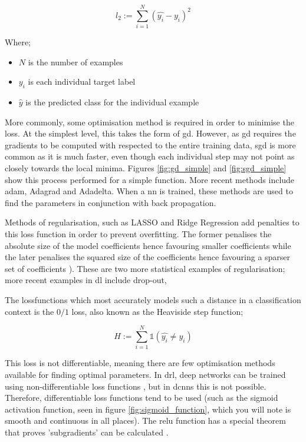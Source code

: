 \begin{equation}
l_2 := \sum_{i = 1}^N (\hat{y_i} - y_i)^2
\end{equation}

Where;

\begin{itemize}
\item $N$ is the number of examples  
\item $y_i$ is each individual target label  
\item $\hat{y}$ is the predicted class for the individual example 
\end{itemize}

More commonly, some optimisation method is required in order to minimise the \gls{loss}.  At the simplest level, this takes the form of \gls{gd}. However, as \gls{gd} requires the gradients to be computed with respected to the entire training data, \gls{sgd} is more common as it is much faster, even though each individual step may not point as closely towards the local minima. Figures  \ref{fig:gd_simple} and \ref{fig:sgd_simple} show this process performed for a simple function. More recent methods include  \gls{adam}, Adagrad and Adadelta. When a \gls{nn} is trained, these methods are used to find the parameters in conjunction with back propagation.  %

Methods of regularisation, such as LASSO and Ridge Regression add penalties to this loss function in order to prevent overfitting. The former penalises the absolute size of the model coefficients hence favouring smaller coefficients while the later penalises the squared size of the coefficients hence favouring a sparser set of coefficients \cite{ridge_lasso}). These are two more statistical examples of regularisation; more recent examples in \gls{dl} include drop-out,  %
\bigskip

The \gls{lossfunction}s which most accurately models such a distance in a classification context is the $0/1$ loss, also known as the Heaviside step function;

\begin{equation}
H := \sum_{i = 1}^N \mathds{1} (\hat{y_i} \neq y_i)  
\end{equation}

This loss is not differentiable, meaning there are few optimisation methods available for finding optimal parameters. In \gls{drl}, deep networks can be trained using non-differentiable loss functions \cite{drl_non_differentiable}, but in \gls{dcnn}s this is not possible. Therefore, differentiable loss functions tend to be used (such as the sigmoid activation function, seen in figure \ref{fig:sigmoid_function}, which you will note is smooth and continuous in all places). The \gls{relu} function has a special theorem that proves 'subgradients' can be calculated \cite{subgradient_theorem}. %

